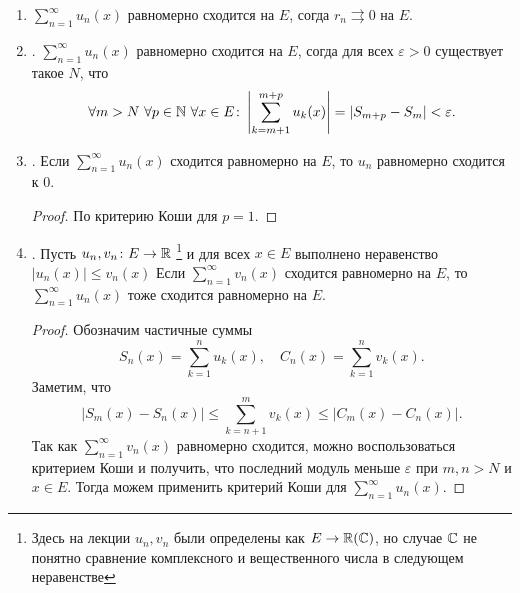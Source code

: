 \begin{prop}
	$ $
	\begin{enumerate}
		\item
			$ \sum_{n=1}^{\infty} u_n(x)$ равномерно сходится на $ E$, согда $ r_n \rightrightarrows 0$ на $ E$.
		\item  {}. $ \sum_{n=1}^{\infty} u_n(x)$ равномерно сходится на $ E$, согда для всех $ \varepsilon  >0$ существует такое $ N$, что
			\[
				\forall m > N ~ \forall p \in  \mathbb{N} ~ \forall x \in  E\colon \left| \sum_{k=m+1}^{m+p} u_k(x) \right| =\left|S_{m+p} -S_m\right|< \varepsilon
			.\]
		\item {}.
			Если $\sum_{n=1}^{\infty} u_n(x)$ сходится равномерно на $ E$, то $ u_n$ равномерно сходится к 0.
			\begin{proof}
				По критерию Коши для $ p = 1$.
			\end{proof}
		\item {}. Пусть $ u_n, v_n \colon E \to  \mathbb{R}$ \footnote{Здесь на лекции $u_n, v_n$ были определены как $ E \to \mathbb{R}(\mathbb{C})$, но случае $\mathbb{C}$ не понятно сравнение комплексного и вещественного числа в следующем неравенстве} и для всех $ x \in E$ выполнено неравенство $ \lvert u_n(x) \rvert \le v_n(x)$
			Если $ \sum_{n=1}^{\infty} v_n(x)$ сходится равномерно на $ E$, то  $ \sum_{n=1}^{\infty} u_n(x)$ тоже сходится равномерно на $ E$.
			\begin{proof}
				Обозначим частичные суммы
				\[
					S_n (x) = \sum_{k=1}^{n}  u_k(x), \quad C_n(x) = \sum_{k=1}^{n} v_k(x)
				.\]
				Заметим, что
				\[
					\left| S_m(x) - S_n(x) \right|  \le  \sum_{k=n+1}^{m} v_k(x) \le \left| C_m(x) - C_n(x) \right|
				.\]
				Так как $ \sum_{n=1}^{\infty} v_n(x)$ равномерно сходится, можно воспользоваться критерием Коши и получить, что последний модуль  меньше $ \varepsilon $ при $ m, n > N$ и  $ x \in E$. Тогда можем применить критерий Коши для $ \sum_{n=1}^{\infty} u_n(x)$.
			\end{proof}


\end{enumerate}
\end{prop}
